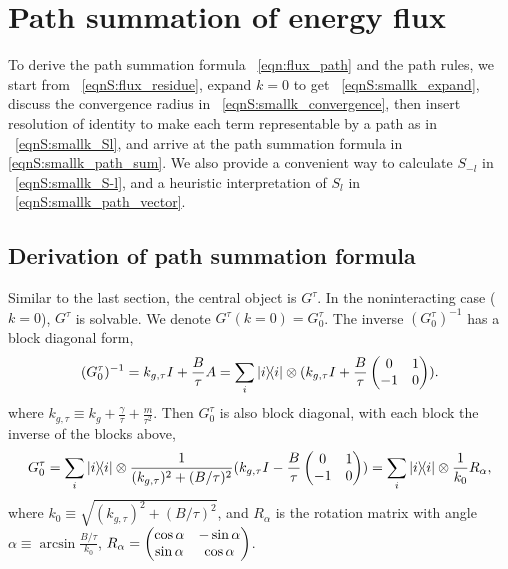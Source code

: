\documentclass[
 amsmath,amssymb,
 aps,
 pre,
 longbibliography,
 10pt, onecolumn,
 notitlepage
]{revtex4-1}
\begin{document}
\section{Path summation of energy flux}
To derive the path summation formula \eqnname~\eqref{eqn:flux_path} and the path rules, we start from \eqnname~\eqref{eqnS:flux_residue}, expand $k=0$ to get \eqnname~\eqref{eqnS:smallk_expand}, discuss the convergence radius in \eqnname~\eqref{eqnS:smallk_convergence}, then insert resolution of identity to make each term representable by a path as in \eqnname~\eqref{eqnS:smallk_Sl}, and arrive at the path summation formula in \eqref{eqnS:smallk_path_sum}.
We also provide a convenient way to calculate $S_{-l}$ in \eqnname~\eqref{eqnS:smallk_S-l}, and a heuristic interpretation of $S_l$ in \eqnname~\eqref{eqnS:smallk_path_vector}.

\subsection{Derivation of path summation formula}
Similar to the last section, the central object is $G^\tau$.
In the noninteracting case ($k=0$), $G^\tau$ is solvable. We denote $G^\tau(k=0) = G^\tau_0$.
The inverse $(G^\tau_0)^{-1}$ has a block diagonal form,
\begin{equation}
    (G^\tau_0)^{-1} = k_{g,\tau} I + \frac{B}{\tau}A
    = \sum_i \ketbra{i}{i} \otimes (k_{g,\tau}I + \frac{B}{\tau} \pmqty{0 & 1 \\ -1 & 0}).
\end{equation}
where $k_{g,\tau} \equiv k_g + \frac{\gamma}{\tau} + \frac{m}{\tau^2}$.
Then $G^\tau_0$ is also block diagonal, with each block the inverse of the blocks above,
\begin{equation} \label{eqnS:smallk_Gtau0}
    G^\tau_0 = \sum_i \ketbra{i}{i} \otimes \frac{1}{(k_{g,\tau})^2 + (B/\tau)^2}(k_{g,\tau} I - \frac{B}{\tau} \pmqty{0 & 1 \\ -1 & 0})
    = \sum_i \ketbra{i}{i} \otimes \frac{1}{k_0}R_\alpha,
\end{equation}
where $k_0 \equiv \sqrt{(k_{g,\tau})^2 + (B/\tau)^2}$, and $R_\alpha$ is the rotation matrix with angle $\alpha \equiv \arcsin{\frac{B/\tau}{k_0}}$, $R_\alpha = \pmqty{\cos\alpha & -\sin\alpha \\ \sin\alpha & \cos\alpha}$.
\end{document}
